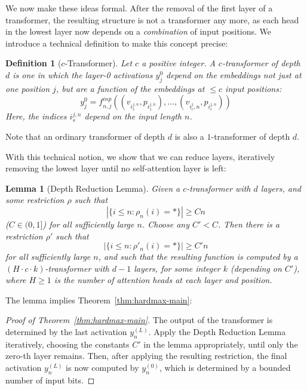 \documentclass[11pt,a4paper]{article}
\newcounter{theorem}
\newtheorem{defin}[theorem]{Definition}
\newtheorem{lemma}[theorem]{Lemma}
\begin{document}
We now make these ideas formal.
After the removal of the first layer of a transformer, the resulting structure is not a transformer any more, as each head in the lowest layer now depends on a \emph{combination} of input positions.
We introduce a technical definition to make this concept precise:

\begin{defin}[$c$-Transformer]
Let $c$ a positive integer. A $c$-transformer of depth $d$ is one in which the layer-0 activations $y_j^0$ depend on the embeddings not just at one position $j$, but are a function of the embeddings at $\leq c$ input positions:
\begin{equation}
    y_j^0 = f^{inp}_{n,j}((v_{i_1^{j,n}}, p_{i_1^{j,n}}), \dots, (v_{i_c^{j},n}, p_{i_c^{j,n}} ))
\end{equation}
Here, the indices ${i_s^{j,n}}$ depend on the input length $n$.
\end{defin}

Note that an ordinary transformer  of depth $d$ is also a $1$-transformer of depth $d$.

With this technical notion, we show that we can reduce layers, iteratively removing the lowest layer until no self-attention layer is left:
\begin{lemma}[Depth Reduction Lemma]\label{lemma:depth-red}
Given a $c$-transformer with $d$ layers, and some restriction $\rho$ such that
\begin{equation}
|\{i \leq n: \rho_n(i) = *\}| \geq Cn
\end{equation}
($C \in (0,1]$)
for all sufficiently large $n$.
Choose any $C' < C$.
Then there is a restriction $\rho'$ 
such that
\begin{equation}
|\{i \leq n: \rho'_n(i) = *\}| \geq C'n
\end{equation}
for all sufficiently large $n$, 
and such that the resulting function is computed by a $(H\cdot c\cdot k)$-transformer with $d-1$ layers, for some integer $k$ (depending on $C'$), where $H \geq 1$ is the number of attention heads at each layer and position.
\end{lemma}
The lemma implies Theorem~\ref{thm:hardmax-main}:
\begin{proof}[Proof of Theorem~\ref{thm:hardmax-main}]
The output of the transformer is determined by the last activation $y_{n}^{(L)}$.
Apply the Depth Reduction Lemma iteratively, choosing the constants $C'$ in the lemma appropriately, until only the zero-th layer remains.
Then, after applying the resulting restriction, the final activation $y_{n}^{(L)}$ is now computed by $y_{n}^{(0)}$, which is determined by a bounded number of input bits.
\end{proof}
\end{document}
